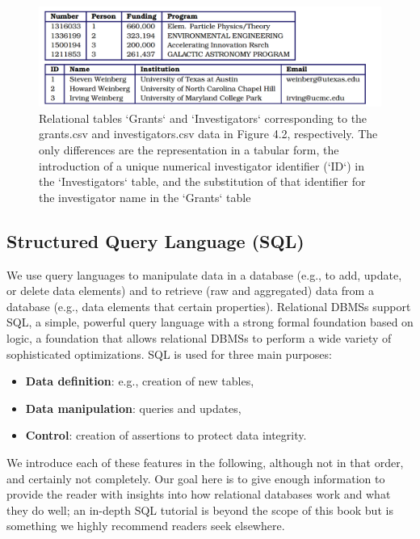 \documentclass[]{krantz}
\begin{document}
\begin{figure}

{\centering \includegraphics[width=0.7\linewidth]{ChapterDB/figures/figdb-2} 

}

\caption{Relational tables `Grants` and `Investigators` corresponding to the grants.csv and investigators.csv data in Figure 4.2, respectively. The only differences are the representation in a tabular form, the introduction of a unique numerical investigator identifier (`ID`) in the `Investigators` table, and the substitution of that identifier for the investigator name in the `Grants` table}\label{fig:figdb-2}
\end{figure}

\subsection{Structured Query Language
(SQL)}\label{structured-query-language-sql}

We use query languages to manipulate data in a database (e.g., to add,
update, or delete data elements) and to retrieve (raw and aggregated)
data from a database (e.g., data elements that certain properties).
Relational DBMSs support SQL, a simple, powerful query language with a
strong formal foundation based on logic, a foundation that allows
relational DBMSs to perform a wide variety of sophisticated
optimizations. SQL is used for three main purposes:

\begin{itemize}
\item
  \textbf{Data definition}: e.g., creation of new tables,
\item
  \textbf{Data manipulation}: queries and updates,
\item
  \textbf{Control}: creation of assertions to protect data integrity.
\end{itemize}

We introduce each of these features in the following, although not in
that order, and certainly not completely. Our goal here is to give
enough information to provide the reader with insights into how
relational databases work and what they do well; an in-depth SQL
tutorial is beyond the scope of this book but is something we highly
recommend readers seek elsewhere.
\end{document}

